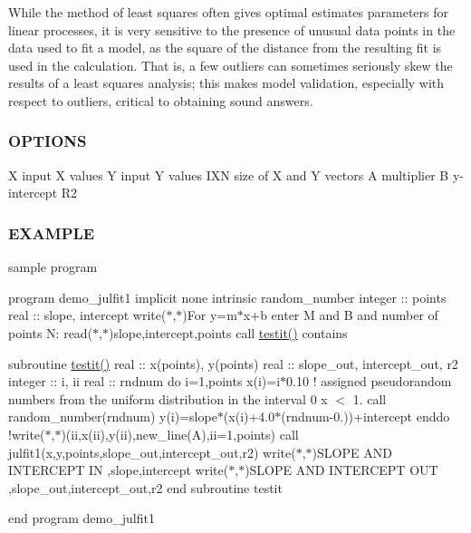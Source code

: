 \begin{DoxyVerb}While the method of least squares often gives optimal estimates parameters for linear processes,
it is very sensitive to the presence of unusual data points in the data used to fit a model, as the square of the
distance from the resulting fit is used in the calculation.
That is, a few outliers can sometimes seriously skew the results of a least squares analysis;
this makes model validation, especially with respect to outliers, critical to obtaining sound answers.
\end{DoxyVerb}


\subsubsection*{O\+P\+T\+I\+O\+NS}

X input X values Y input Y values I\+XN size of X and Y vectors A multiplier B y-\/intercept R2 \subsubsection*{E\+X\+A\+M\+P\+LE}

sample program

program demo\+\_\+julfit1 implicit none intrinsic random\+\_\+number integer \+:\+: points real \+:\+: slope, intercept write($\ast$,$\ast$)\textquotesingle{}For y=m$\ast$x+b enter M and B and number of points N\+:\textquotesingle{} read($\ast$,$\ast$)slope,intercept,points call \hyperlink{__uname_8f90_a483d2219923eccf493a883fceee5a424}{testit()} contains

subroutine \hyperlink{__uname_8f90_a483d2219923eccf493a883fceee5a424}{testit()} real \+:\+: x(points), y(points) real \+:\+: slope\+\_\+out, intercept\+\_\+out, r2 integer \+:\+: i, ii real \+:\+: rndnum do i=1,points x(i)=i$\ast$0.10 ! assigned pseudorandom numbers from the uniform distribution in the interval 0 x $<$ 1. call random\+\_\+number(rndnum) y(i)=slope$\ast$(x(i)+4.0$\ast$(rndnum-\/0.))+intercept enddo !write($\ast$,$\ast$)(ii,x(ii),y(ii),new\+\_\+line(\textquotesingle{}A\textquotesingle{}),ii=1,points) call julfit1(x,y,points,slope\+\_\+out,intercept\+\_\+out,r2) write($\ast$,$\ast$)\textquotesingle{}S\+L\+O\+PE A\+ND I\+N\+T\+E\+R\+C\+E\+PT IN \textquotesingle{},slope,intercept write($\ast$,$\ast$)\textquotesingle{}S\+L\+O\+PE A\+ND I\+N\+T\+E\+R\+C\+E\+PT O\+UT \textquotesingle{},slope\+\_\+out,intercept\+\_\+out,r2 end subroutine testit

end program demo\+\_\+julfit1

